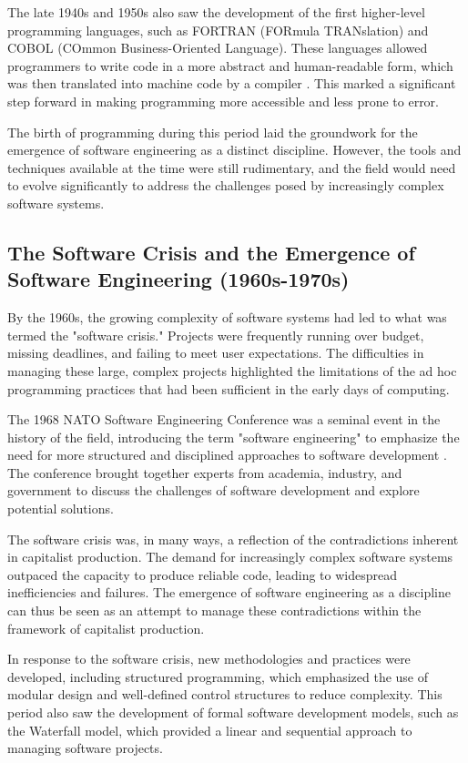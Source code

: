 \begin{refsection}
\begin{multicols}{2}
{The late 1940s and 1950s also saw the development of the first higher-level programming languages, such as FORTRAN (FORmula TRANslation) and COBOL (COmmon Business-Oriented Language). These languages allowed programmers to write code in a more abstract and human-readable form, which was then translated into machine code by a compiler \cite[p. 89]{beyer2009}. This marked a significant step forward in making programming more accessible and less prone to error.

The birth of programming during this period laid the groundwork for the emergence of software engineering as a distinct discipline. However, the tools and techniques available at the time were still rudimentary, and the field would need to evolve significantly to address the challenges posed by increasingly complex software systems.

\subsection{The Software Crisis and the Emergence of Software Engineering (1960s-1970s)}

By the 1960s, the growing complexity of software systems had led to what was termed the "software crisis." Projects were frequently running over budget, missing deadlines, and failing to meet user expectations. The difficulties in managing these large, complex projects highlighted the limitations of the ad hoc programming practices that had been sufficient in the early days of computing.

The 1968 NATO Software Engineering Conference was a seminal event in the history of the field, introducing the term "software engineering" to emphasize the need for more structured and disciplined approaches to software development \cite[p. 5]{nato1968}. The conference brought together experts from academia, industry, and government to discuss the challenges of software development and explore potential solutions.

The software crisis was, in many ways, a reflection of the contradictions inherent in capitalist production. The demand for increasingly complex software systems outpaced the capacity to produce reliable code, leading to widespread inefficiencies and failures. The emergence of software engineering as a discipline can thus be seen as an attempt to manage these contradictions within the framework of capitalist production.

In response to the software crisis, new methodologies and practices were developed, including structured programming, which emphasized the use of modular design and well-defined control structures to reduce complexity. This period also saw the development of formal software development models, such as the Waterfall model, which provided a linear and sequential approach to managing software projects.

}
\end{multicols}
\end{refsection}
